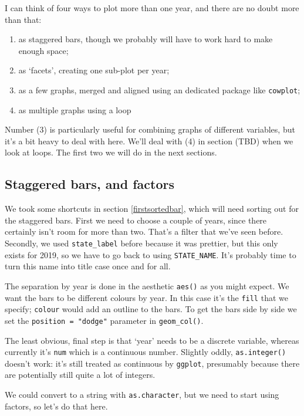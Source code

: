 \documentclass[
]{book}
\providecommand{\tightlist}{%
  \setlength{\itemsep}{0pt}\setlength{\parskip}{0pt}}
\begin{document}
I can think of four ways to plot more than one year, and there are no doubt more than that:

\begin{enumerate}
\def\labelenumi{\arabic{enumi})}
\tightlist
\item
  as staggered bars, though we probably will have to work hard to make enough space;
\item
  as `facets', creating one sub-plot per year;
\item
  as a few graphs, merged and aligned using an dedicated package like \texttt{cowplot};
\item
  as multiple graphs using a loop
\end{enumerate}

Number (3) is particularly useful for combining graphs of different variables, but it's a bit heavy to deal with here. We'll deal with (4) in section (TBD) when we look at loops. The first two we will do in the next sections.

\hypertarget{factors}{%
\subsection{Staggered bars, and factors}\label{factors}}

We took some shortcuts in section \ref{firstsortedbar}, which will need sorting out for the staggered bars. First we need to choose a couple of years, since there certainly isn't room for more than two. That's a filter that we've seen before. Secondly, we used \texttt{state\_label} before because it was prettier, but this only exists for 2019, so we have to go back to using \texttt{STATE\_NAME}. It's probably time to turn this name into title case once and for all.

The separation by year is done in the aesthetic \texttt{aes()} as you might expect. We want the bars to be different colours by year. In this case it's the \texttt{fill} that we specify; \texttt{colour} would add an outline to the bars. To get the bars side by side we set the \texttt{position\ =\ "dodge"} parameter in \texttt{geom\_col()}.

The least obvious, final step is that `year' needs to be a discrete variable, whereas currently it's \texttt{num} which is a continuous number. Slightly oddly, \texttt{as.integer()} doesn't work: it's still treated as continuous by \texttt{ggplot}, presumably because there are potentially still quite a lot of integers.

We could convert to a string with \texttt{as.character}, but we need to start using factors, so let's do that here.
\end{document}
